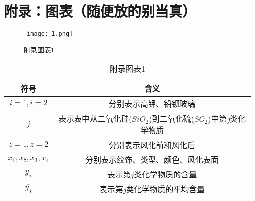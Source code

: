 \section{附录：图表（随便放的别当真）}

\begin{figure}[H] 
	\centering %
	\texttt{[image: 1.png]} %
	\caption{附录图表1} %
	\label{Fig.main2} %
\end{figure}

\begin{table}[H]
	\centering
	\begin{tabular}{c c} 
		\toprule[1.5pt]
		符号 & 含义  \\ 
		\midrule[1pt]
		$i=1,i=2$ & 分别表示高钾、铅钡玻璃 \\ 
		$j$ & 表示表中从二氧化硅($SiO_2$)到二氧化硫($SO_2$)中第$j$类化学物质 \\
		$z=1,z=2$ & 分别表示风化前和风化后 \\
		$x_1,x_2,x_3,x_4$ & 分别表示纹饰、类型、颜色、风化表面 \\
		$y_j$ & 表示第$j$类化学物质的含量 \\ 
		$\overline{y_j}$ & 表示第$j$类化学物质的平均含量 \\  
		\toprule[1.5pt]
	\end{tabular}
    \caption{附录图表1}
\end{table} 
